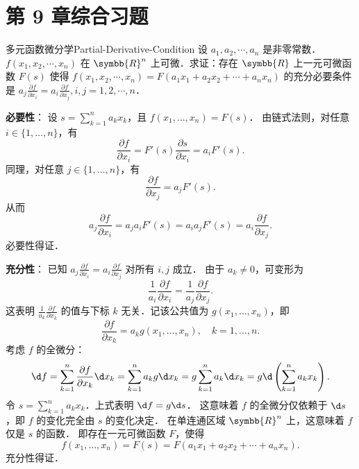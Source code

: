 \section{第 9 章综合习题}

\begin{problem}{多元函数微分学}{Partial-Derivative-Condition}
    设 $a_1, a_2, \cdots, a_n$ 是非零常数．$f(x_1, x_2, \cdots, x_n)$ 在 $\symbb{R}^n$ 上可微．求证：存在 $\symbb{R}$ 上一元可微函数 $F(s)$ 使得 $f(x_1, x_2, \cdots, x_n) = F(a_1 x_1 + a_2 x_2 + \cdots + a_n x_n)$ 的充分必要条件是 $a_j \frac{\partial f}{\partial x_i} = a_i \frac{\partial f}{\partial x_j}, i, j = 1, 2, \cdots, n$．
\end{problem}

\begin{solution}

    \textbf{必要性}：
    设 $s = \sum_{k=1}^n a_k x_k$，且 $f(x_1, \dots, x_n) = F(s)$．
    由链式法则，对任意 $i \in \{1, \dots, n\}$，有
    \begin{equation}
        \frac{\partial f}{\partial x_i} = F'(s) \frac{\partial s}{\partial x_i} = a_i F'(s).
    \end{equation}
    同理，对任意 $j \in \{1, \dots, n\}$，有
    \begin{equation}
        \frac{\partial f}{\partial x_j} = a_j F'(s).
    \end{equation}
    从而
    \begin{equation}
        a_j \frac{\partial f}{\partial x_i} = a_j a_i F'(s) = a_i a_j F'(s) = a_i \frac{\partial f}{\partial x_j}.
    \end{equation}
    必要性得证．

    \textbf{充分性}：
    已知 $a_j \frac{\partial f}{\partial x_i} = a_i \frac{\partial f}{\partial x_j}$ 对所有 $i, j$ 成立．
    由于 $a_k \neq 0$，可变形为
    \begin{equation}
        \frac{1}{a_i} \frac{\partial f}{\partial x_i} = \frac{1}{a_j} \frac{\partial f}{\partial x_j}.
    \end{equation}
    这表明 $\frac{1}{a_k} \frac{\partial f}{\partial x_k}$ 的值与下标 $k$ 无关．记该公共值为 $g(x_1, \dots, x_n)$，即
    \begin{equation}
        \frac{\partial f}{\partial x_k} = a_k g(x_1, \dots, x_n), \quad k=1, \dots, n.
    \end{equation}
    考虑 $f$ 的全微分：
    \begin{equation}
        \d f = \sum_{k=1}^n \frac{\partial f}{\partial x_k} \d x_k = \sum_{k=1}^n a_k g \d x_k = g \sum_{k=1}^n a_k \d x_k = g \d \left( \sum_{k=1}^n a_k x_k \right).
    \end{equation}
    令 $s = \sum_{k=1}^n a_k x_k$．上式表明 $\d f = g \d s$．
    这意味着 $f$ 的全微分仅依赖于 $\d s$，即 $f$ 的变化完全由 $s$ 的变化决定．
    在单连通区域 $\symbb{R}^n$ 上，这意味着 $f$ 仅是 $s$ 的函数．
    即存在一元可微函数 $F$，使得
    \begin{equation}
        f(x_1, \dots, x_n) = F(s) = F(a_1 x_1 + a_2 x_2 + \cdots + a_n x_n).
    \end{equation}
    充分性得证．
\end{solution}

